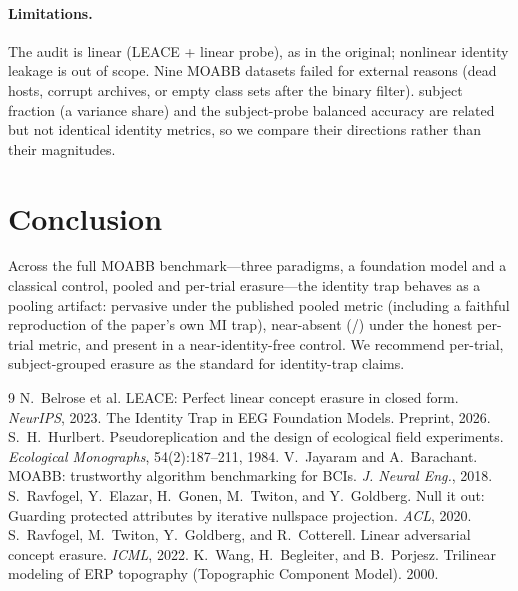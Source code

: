 \documentclass[11pt]{article}
\begin{document}
\paragraph{Limitations.} The audit is linear (LEACE + linear probe), as in the original; nonlinear
identity leakage is out of scope. Nine MOABB datasets failed for external reasons (dead hosts, corrupt
archives, or empty class sets after the binary filter). \reve{} subject fraction (a variance share) and
the \tcm{} subject-probe balanced accuracy are related but not identical identity metrics, so we compare
their directions rather than their magnitudes.

\section{Conclusion}
Across the full MOABB benchmark---three paradigms, a foundation model and a classical control, pooled
and per-trial erasure---the identity trap behaves as a pooling artifact: pervasive under the published
pooled metric (including a faithful reproduction of the paper's own MI trap), near-absent
(\fmPtTrapTotal{}/\fmPtNTotal{}) under the honest per-trial metric, and present in a near-identity-free
control. We recommend per-trial, subject-grouped erasure as the standard for identity-trap claims.

\begin{thebibliography}{9}
 N.~Belrose et al. LEACE: Perfect linear concept
erasure in closed form. \emph{NeurIPS}, 2023.
 The Identity Trap in EEG Foundation Models. Preprint, 2026.
 S.~H.~Hurlbert. Pseudoreplication and the design of ecological
field experiments. \emph{Ecological Monographs}, 54(2):187--211, 1984.
 V.~Jayaram and A.~Barachant. MOABB: trustworthy
algorithm benchmarking for BCIs. \emph{J. Neural Eng.}, 2018.
 S.~Ravfogel, Y.~Elazar, H.~Gonen, M.~Twiton, and
Y.~Goldberg. Null it out: Guarding protected attributes by iterative nullspace projection.
\emph{ACL}, 2020.
 S.~Ravfogel, M.~Twiton, Y.~Goldberg, and
R.~Cotterell. Linear adversarial concept erasure. \emph{ICML}, 2022.
 K.~Wang, H.~Begleiter, and B.~Porjesz. Trilinear modeling of
ERP topography (Topographic Component Model). 2000.
\end{thebibliography}
\end{document}
